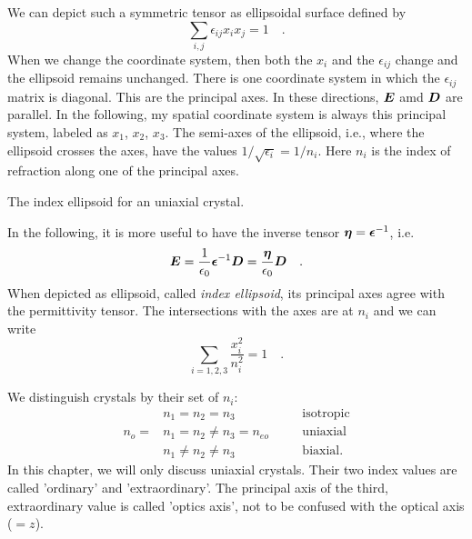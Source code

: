 We can depict such a symmetric tensor as ellipsoidal surface defined by 
\begin{equation}
     \sum_{i,j} \epsilon_{i j}  x_i x_j = 1 \quad .
\end{equation}
When we change the coordinate system, then both the $x_i$ and the $\epsilon_{ij}$ change and the ellipsoid remains unchanged. There is one coordinate system in which the $\epsilon_{ij}$ matrix is diagonal. This are the principal axes.  In these directions, $\boldsymbol{E}$ amd $\boldsymbol{D}$ are parallel. In the following, my spatial coordinate system is always this principal system, labeled as $x_1$, $x_2$, $x_3$. The semi-axes of the ellipsoid, i.e., where the ellipsoid crosses the axes, have the values $1/\sqrt{\epsilon_i} = 1/n_i$. Here $n_i$ is the index of refraction along one of the principal axes.


\begin{marginfigure}
    \caption{The index ellipsoid for an uniaxial crystal.}
\end{marginfigure}


In the following, it is more useful to have the inverse tensor $\boldsymbol{\eta} = \boldsymbol{\epsilon}^{-1}$, i.e.
\begin{equation}
    \boldsymbol{E} = \frac{1}{\epsilon_0} \boldsymbol{\epsilon}^{-1} \boldsymbol{D}  = \frac{\boldsymbol{\eta}}{\epsilon_0}  \boldsymbol{D} \quad .
 \end{equation}
When depicted as ellipsoid, called \emph{index ellipsoid}, its principal axes agree with the permittivity tensor. The intersections with the axes are at $n_i$ and we can write
\begin{equation}
    \sum_{i=1,2,3} \frac{x_i^2}{n_i^2} = 1 \quad .
\end{equation}



We distinguish crystals by their set of $n_i$:
\begin{align}
          &  n_1 = n_2 = n_3             & & \quad \text{isotropic} \\
 n_{o} = &  n_1 = n_2  \neq n_3  =n_{eo} && \quad \text{uniaxial} \\
           &   n_1 \neq n_2  \neq n_3      & & \quad \text{biaxial.} 
\end{align}
In this chapter, we will only discuss  uniaxial crystals. Their two index values are called 'ordinary' and 'extraordinary'. The principal axis of the third, extraordinary value is called 'optics axis', not to be confused with the optical axis ($=z$).


